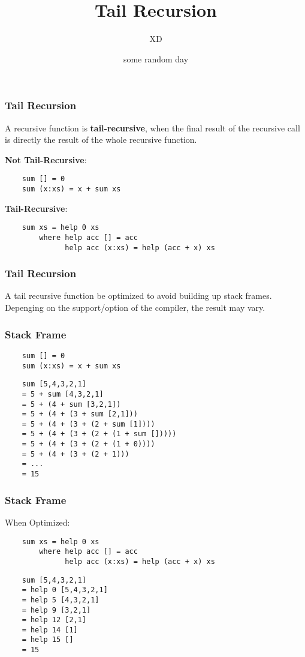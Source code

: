 \documentclass{beamer}
\title{Tail Recursion}
\author{XD}
\date{some random day}
\begin{document}
\frame{\titlepage}

\begin{frame}[fragile]
    \frametitle{Tail Recursion}
    A recursive function is \textbf{tail-recursive}, when the final result of the recursive call is directly the result of the whole recursive function.

    \medskip
    \textbullet \textbf{Not Tail-Recursive}:
    \begin{verbatim}
    sum [] = 0
    sum (x:xs) = x + sum xs
    \end{verbatim}

    \medskip
    \textbullet \textbf{Tail-Recursive}:
    \begin{verbatim}
    sum xs = help 0 xs
        where help acc [] = acc
              help acc (x:xs) = help (acc + x) xs
    \end{verbatim}
\end{frame}

\begin{frame}
    \frametitle{Tail Recursion}
    A tail recursive function {\color{red}{can}} be optimized to avoid building up stack frames. Depenging on the support/option of the compiler, the result may vary.
\end{frame}

\begin{frame}[fragile]
    \frametitle{Stack Frame}
    \begin{verbatim}
    sum [] = 0
    sum (x:xs) = x + sum xs
    \end{verbatim}

    \medskip
    \begin{verbatim}
    sum [5,4,3,2,1]
    = 5 + sum [4,3,2,1]
    = 5 + (4 + sum [3,2,1])
    = 5 + (4 + (3 + sum [2,1]))
    = 5 + (4 + (3 + (2 + sum [1])))
    = 5 + (4 + (3 + (2 + (1 + sum []))))
    = 5 + (4 + (3 + (2 + (1 + 0))))
    = 5 + (4 + (3 + (2 + 1)))
    = ...
    = 15
    \end{verbatim}
\end{frame}

\begin{frame}[fragile]
    \frametitle{Stack Frame}
    When Optimized:
    \begin{verbatim}
    sum xs = help 0 xs
        where help acc [] = acc
              help acc (x:xs) = help (acc + x) xs
    \end{verbatim}

    \medskip
    \begin{verbatim}
    sum [5,4,3,2,1]
    = help 0 [5,4,3,2,1]
    = help 5 [4,3,2,1]
    = help 9 [3,2,1]
    = help 12 [2,1]
    = help 14 [1]
    = help 15 []
    = 15
    \end{verbatim}
\end{frame}
\end{document}
